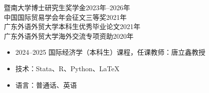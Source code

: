 \documentclass[UTF8,10pt,fontset=none]{ctexart}
\newcommand{\cvsection}[1]{\vspace{3pt}{\large\bfseries #1}\par\vspace{1pt}{\color{rulegray}\hrule}\vspace{2pt}}
\newcommand{\award}[2]{#1\hfill #2\\[2pt]}
\begin{document}
\cvsection{获奖荣誉}
\award{暨南大学博士研究生奖学金}{2023年--2026年}
\award{中国国际贸易学会年会征文三等奖}{2021年}
\award{广东外语外贸大学本科生优秀毕业论文}{2021年}
\award{广东外语外贸大学海外交流专项资助}{2020年}

\cvsection{助教工作}
\begin{itemize}
  \item 2024--2025 \quad 国际经济学（本科生）课程，任课教师：唐立鑫教授
\end{itemize}

\cvsection{技能}
\begin{itemize}
  \item 技术：Stata、R、Python、\LaTeX
  \item 语言：普通话、英语
\end{itemize}
\end{document}
